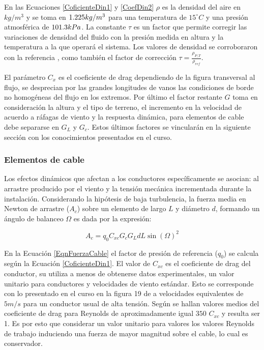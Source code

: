 En las Ecuaciones \ref{CoficienteDin1} y \ref{CoefDin2} $\rho$ es la densidad del aire en $kg/m^{3}$ y se toma en $1.225 \vspace{0.1cm} kg/m^{3}$ para una temperatura de $15^{\circ}C$  y una presión atmosférica de $101.3 \vspace{0.1cm} kPa$. La constante $\tau$ es un factor que permite corregir las variaciones de densidad del fluido con la presión medida en altura y la temperatura a la que operará el sistema. Los valores de densidad se corroboraron con la referencia \cite{cengel2007termodinamica}, como también el factor de corrección $\tau=\frac{\rho_{P,T}}{\rho_{ref}}$.

El parámetro $C_x$ es el coeficiente de drag dependiendo de la figura transversal al flujo, se desprecian por las grandes longitudes de vanos las condiciones de borde no homogéneas del flujo en los extremos. Por último el factor restante $G$ toma en consideración la altura y el tipo de terreno, el incremento en la velocidad de acuerdo a ráfagas de viento y la respuesta dinámica, para elementos de cable debe separarse en $G_L$ y $G_c$. Estos últimos factores se vincularán  en la siguiente sección con los conocimientos presentados en el curso. 




\subsubsection{Elementos de cable}\label{ElemCableNorma}
Los efectos dinámicos que afectan a los conductores específicamente se asocian: al arrastre producido por el viento y la tensión mecánica incrementada durante la instalación. Considerando la hipótesis de baja turbulencia, la fuerza media en Newton de arrastre ($A_c$) sobre un elemento de largo $L$ y diámetro $d$, formando un ángulo de balanceo $\Omega$ es dada por la expresión:

\begin{equation} \label{EqnFuerzaCable}
	A_c=q_0C_{xc}G_cG_L d L \sin(\Omega) ^{2}
\end{equation}

En la Ecuación \ref{EqnFuerzaCable} el factor de presión de referencia ($q_0$) se calcula según la Ecuación  \ref{CoficienteDin1}. El valor de $C_{xc}$ es el coeficiente de drag del conductor, su utiliza a menos de obtenerse datos experimentales, un valor unitario para conductores y velocidades de viento estándar. Esto se corresponde con lo presentado en el curso en la figura 19 de \cite{Duranona2018} a velocidades equivalentes de $5m/s$ para un conductor usual de alta tensión. Según \cite{Son2016} se hallan valores medios del coeficiente de drag para Reynolds de aproximadamente igual $350$ $C_{xc}$ y resulta ser 1. Es por esto que considerar un valor unitario para valores los valores Reynolds de trabajo induciendo una fuerza de mayor magnitud sobre el cable, lo cual es conservador. 

